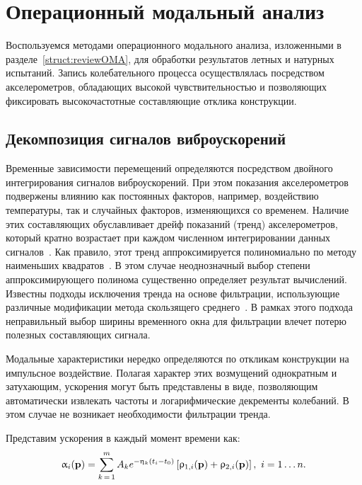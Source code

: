 \section{Операционный модальный анализ}

Воспользуемся методами операционного модального анализа, изложенными в разделе~\ref{struct:reviewOMA}, для обработки результатов летных и натурных испытаний. Запись колебательного процесса осуществлялась посредством акселерометров, обладающих высокой чувствительностью и позволяющих фиксировать высокочастотные составляющие отклика конструкции. 

\subsection{Декомпозиция сигналов виброускорений} \label{struct:accelerationDecompositionApproach}

Временные зависимости перемещений определяются посредством двойного интегрирования сигналов виброускорений. При этом показания акселерометров подвержены влиянию как постоянных факторов, например, воздействию температуры, так и случайных факторов, изменяющихся со временем. Наличие этих составляющих обуславливает дрейф показаний (тренд) акселерометров, который кратно возрастает при каждом численном интегрировании данных сигналов~\cite{lib:oma:Thong}. Как правило, этот тренд аппроксимируется полиномиально по методу наименьших квадратов~\cite{lib:oma:Gao}. В этом случае неоднозначный выбор степени аппроксимирующего полинома существенно определяет результат вычислений. Известны подходы исключения тренда на основе фильтрации, использующие различные модификации метода скользящего среднего~\cite{lib:oma:Guo}. В рамках этого подхода неправильный выбор ширины временного окна для фильтрации влечет потерю полезных составляющих сигнала.

Модальные характеристики нередко определяются по откликам конструкции на импульсное воздействие. Полагая характер этих возмущений однократным и затухающим, ускорения могут быть представлены в виде, позволяющим автоматически извлекать частоты и логарифмические декременты колебаний. В этом случае не возникает необходимости фильтрации тренда. 

Представим ускорения в каждый момент времени как:
\begin{equation}
	\upalpha_i(\mathbf{p}) = \sum\limits_{k\,=\,1} ^ m A_k e ^ {-\upeta_k (t_i - t_0)} \left[ \uprho_{1,i}(\mathbf{p}) + \uprho_{2, i}(\mathbf{p}) \right], \ i = 1 \hdots n. \label{eq:accelDecomposition}
\end{equation}

